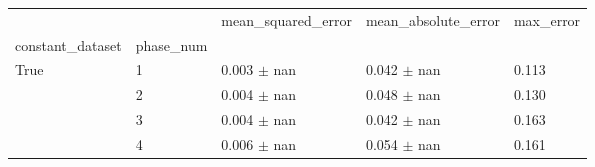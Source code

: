 \begin{tabular}{lllll}
\toprule
 &  & mean_squared_error & mean_absolute_error & max_error \\
constant_dataset & phase_num &  &  &  \\
\midrule
\multirow[t]{4}{*}{True} & 1 & 0.003 $\pm$ nan & 0.042 $\pm$ nan & 0.113 \\
 & 2 & 0.004 $\pm$ nan & 0.048 $\pm$ nan & 0.130 \\
 & 3 & 0.004 $\pm$ nan & 0.042 $\pm$ nan & 0.163 \\
 & 4 & 0.006 $\pm$ nan & 0.054 $\pm$ nan & 0.161 \\
\cline{1-5}
\bottomrule
\end{tabular}
